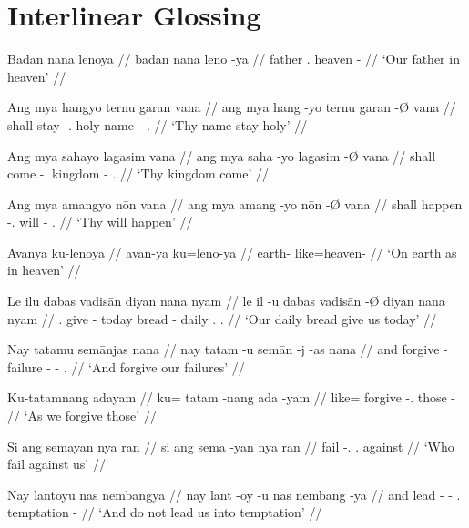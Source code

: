 \documentclass[12pt,paper=a4]{scrartcl}
\begin{document}
\section{Interlinear Glossing}

\ex
\begingl
    \glpreamble Badan nana lenoya //
    \gla badan nana leno -ya //
    \glb father \Fpl{}.\Gen{} heaven -\Loc{} //
    \glft `Our father in heaven' //
\endgl
\xe

\ex
\begingl
    \glpreamble Ang mya hangyo ternu garan vana //
    \gla ang mya hang -yo ternu garan -Ø vana //
    \glb \AgtT{} shall stay -\Tsg{}.\N{} holy name -\Top{} \Ssg{}.\Gen{} //
    \glft `Thy name stay holy' //
\endgl
\xe

\ex
\begingl
    \glpreamble Ang mya sahayo lagasim vana //
    \gla ang mya saha -yo lagasim -Ø vana //
    \glb \AgtT{} shall come -\Tsg{}.\N{} kingdom -\Top{} \Ssg{}.\Gen{} //
    \glft `Thy kingdom come' //
\endgl
\xe

\ex
\begingl
    \glpreamble Ang mya amangyo nōn vana //
    \gla ang mya amang -yo nōn -Ø vana //
    \glb \AgtT{} shall happen -\Tsg{}.\N{} will -\Top{} \Ssg{}.\Gen{} //
    \glft `Thy will happen' //
\endgl
\xe

\ex
\begingl
    \glpreamble Avanya ku-lenoya //
    \gla avan-ya ku=leno-ya //
    \glb earth-\Loc{} like=heaven-\Loc{} //
    \glft `On earth as in heaven' //
\endgl
\xe

\ex
\begingl
    \glpreamble Le ilu dabas vadisān diyan nana nyam //
    \gla le il -u dabas vadisān -Ø diyan nana nyam //
    \glb \PatT{}.\Inan{} give -\Imp{} today bread -\Top{} daily \Fpl{}.\Gen{} \Fpl{}.\Dat{} //
    \glft `Our daily bread give us today' //
\endgl
\xe

\ex
\begingl
    \glpreamble Nay tatamu semānjas nana //
    \gla nay tatam -u semān -j -as nana //
    \glb and forgive -\Imp{} failure -\Pl{} -\Parg{} \Fpl{}.\Gen{} //
    \glft `And forgive our failures' //
\endgl
\xe

\ex
\begingl
    \glpreamble Ku-tatamnang adayam //
    \gla ku= tatam -nang ada -yam //
    \glb like= forgive -\Fpl{}.\Aarg{} those -\Dat{} //
    \glft `As we forgive those' //
\endgl
\xe

\ex
\begingl
    \glpreamble Si ang semayan nya ran //
    \gla si ang sema -yan nya ran //
    \glb \Rel{} \AgtT{} fail -\Tpl{}.\M{} \Fpl{}.\Loc{} against //
    \glft `Who fail against us' //
\endgl
\xe

\ex
\begingl
    \glpreamble Nay lantoyu nas nembangya //
    \gla nay lant -oy -u nas nembang -ya //
    \glb and lead -\Neg{} -\Imp{} \Fpl{}.\Parg{} temptation -\Loc{} //
    \glft `And do not lead us into temptation' //
\endgl
\xe
\end{document}
